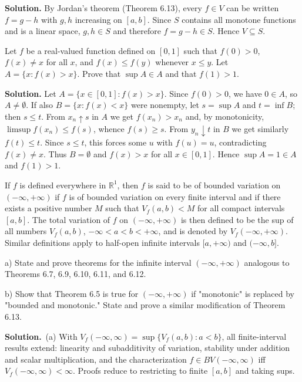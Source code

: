 \noindent\textbf{Solution.}
By Jordan’s theorem (Theorem 6.13), every $f\in V$ can be written $f=g-h$ with $g,h$ increasing on $[a,b]$. Since $S$ contains all monotone functions and is a linear space, $g,h\in S$ and therefore $f=g-h\in S$. Hence $V\subseteq S$.

\begin{problembox}
Let $f$ be a real-valued function defined on $[0, 1]$ such that $f(0) > 0$, $f(x) \neq x$ for all $x$, and $f(x) \leq f(y)$ whenever $x \leq y$. Let $A = \{x: f(x) > x\}$. Prove that $\sup A \in A$ and that $f(1) > 1$.
\end{problembox}

\noindent\textbf{Solution.}
Let $A=\{x\in[0,1]: f(x)>x\}$. Since $f(0)>0$, we have $0\in A$, so $A\neq\emptyset$. If also $B=\{x: f(x)<x\}$ were nonempty, let $s=\sup A$ and $t=\inf B$; then $s\le t$. From $x_n\uparrow s$ in $A$ we get $f(x_n)>x_n$ and, by monotonicity, $\limsup f(x_n)\le f(s)$, whence $f(s)\ge s$. From $y_n\downarrow t$ in $B$ we get similarly $f(t)\le t$. Since $s\le t$, this forces some $u$ with $f(u)=u$, contradicting $f(x)\ne x$. Thus $B=\emptyset$ and $f(x)>x$ for all $x\in[0,1]$. Hence $\sup A=1\in A$ and $f(1)>1$.

\begin{problembox}
If $f$ is defined everywhere in $\mathbb{R}^1$, then $f$ is said to be of bounded variation on $(-\infty, +\infty)$ if $f$ is of bounded variation on every finite interval and if there exists a positive number $M$ such that $V_f(a, b) < M$ for all compact intervals $[a, b]$. The total variation of $f$ on $(-\infty, +\infty)$ is then defined to be the sup of all numbers $V_f(a, b)$, $-\infty < a < b < +\infty$, and is denoted by $V_f(-\infty, +\infty)$. Similar definitions apply to half-open infinite intervals $[a, +\infty)$ and $(-\infty, b]$.

a) State and prove theorems for the infinite interval $(-\infty, +\infty)$ analogous to Theorems 6.7, 6.9, 6.10, 6.11, and 6.12.

b) Show that Theorem 6.5 is true for $(-\infty, +\infty)$ if "monotonic" is replaced by "bounded and monotonic." State and prove a similar modification of Theorem 6.13.
\end{problembox}

\noindent\textbf{Solution.}
\,(a) With $V_f(-\infty,\infty)=\sup\{V_f(a,b): a<b\}$, all finite-interval results extend: linearity and subadditivity of variation, stability under addition and scalar multiplication, and the characterization $f\in BV(-\infty,\infty)$ iff $V_f(-\infty,\infty)<\infty$. Proofs reduce to restricting to finite $[a,b]$ and taking sups.

